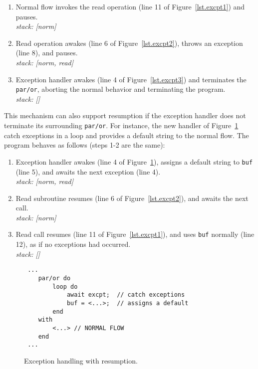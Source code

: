 \documentclass{acm_proc_article-sp}
\newcommand{\code}[1] {{\small{\texttt{#1}}}}
\newcommand{\1}{\;}
\newcommand{\2}{\;\;}
\newcommand{\3}{\;\;\;}
\newcommand{\5}{\;\;\;\;\;}
\begin{document}
{\small
\begin{enumerate}
\setlength{\itemsep}{0pt}
\item Normal flow invokes the read operation (line 11 of 
    Figure~\ref{lst.excpt1}) and pauses.\\
    \emph{stack: [norm]}
\item Read operation awakes (line 6 of Figure~\ref{lst.excpt2}), throws an 
    exception (line 8), and pauses.\\
    \emph{stack: [norm, read]}
\item Exception handler awakes (line 4 of Figure~\ref{lst.excpt3}) and 
terminates the \code{par/or}, aborting the normal behavior and terminating the 
program. \\
    \emph{stack: []}
\end{enumerate}
}

This mechanism can also support resumption if the exception handler does not 
terminate its surrounding \code{par/or}.
For instance, the new handler of Figure~\ref{lst.excpt4} catch exceptions in a 
loop and provides a default string to the normal flow.
The program behaves as follows (steps 1-2 are the same):

{\small
\begin{enumerate}[start=3]
\setlength{\itemsep}{0pt}
\item Exception handler awakes (line 4 of Figure~\ref{lst.excpt4}), assigns a 
default string to \code{buf} (line 5), and awaits the next exception (line 4).  \\
    \emph{stack: [norm, read]}
\item Read subroutine resumes (line 6 of Figure~\ref{lst.excpt2}), and awaits 
the next call. \\
    \emph{stack: [norm]}
\item Read call resumes (line 11 of Figure~\ref{lst.excpt1}), and uses 
\code{buf} normally (line 12), as if no exceptions had occurred. \\
    \emph{stack: []}
\end{enumerate}
}

\begin{figure}[t]
\begin{lstlisting}
 ...
    par/or do
        loop do
            await excpt;  // catch exceptions
            buf = <...>;  // assigns a default
        end
    with
        <...> // NORMAL FLOW
    end
 ...
\end{lstlisting}
\caption{ Exception handling with resumption.
\label{lst.excpt4}
}
\end{figure}
\end{document}
